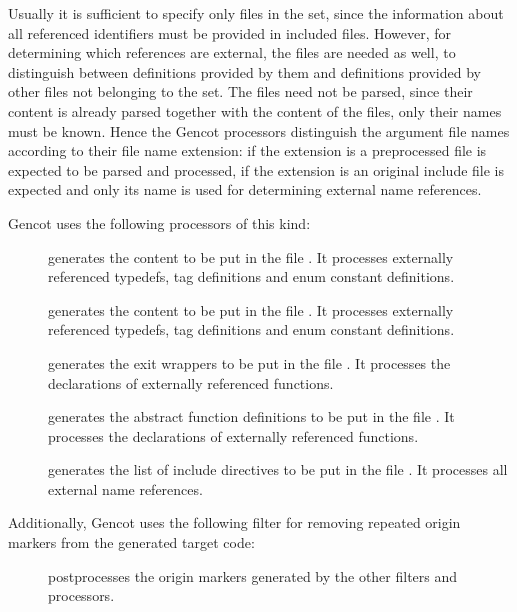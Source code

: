 Usually it is sufficient to specify only  files in the set, since the information about all referenced 
identifiers must be provided in included  files. However, for determining which references are external, the
 files are needed as well, to distinguish between definitions provided by them and definitions provided
by other  files not belonging to the set. The  files need not be parsed, since their content is
already parsed together with the content of the  files, only their names must be known. Hence the Gencot
processors distinguish the argument file names according to their file name extension: if the extension is 
 a preprocessed  file is expected to be parsed and processed, if the extension is 
an original include file is expected and only its name is used for determining external name references.

Gencot uses the following processors of this kind:
\begin{description}
\item[] generates the content to be put in the file . It 
processes externally referenced typedefs, tag definitions and enum constant definitions.
\item[] generates the content to be put in the file . It 
processes externally referenced typedefs, tag definitions and enum constant definitions.
\item[] generates the exit wrappers to be put in the file . It processes
the declarations of externally referenced functions.
\item[] generates the abstract function definitions to be put in the file 
. It processes the declarations of externally referenced functions.
\item[] generates the list of include directives to be put in the file
. It processes all external name references. 
\end{description}

Additionally, Gencot uses the following filter for removing repeated origin markers from the generated target code:
\begin{description}
\item[] postprocesses the origin markers generated by the other filters and processors.
\end{description}


